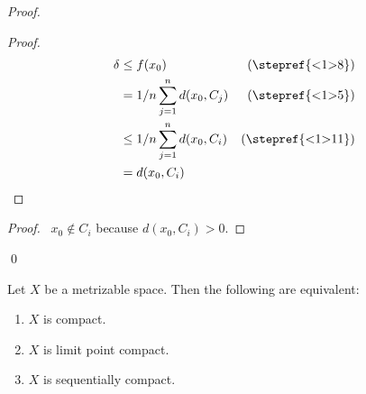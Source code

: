 \begin{proof}
  \begin{proof}
    \pf
    \begin{align*}
      \delta & \leq f(x_0) & (\text{\stepref{<1>8}}) \\
      & = 1/n \sum_{j=1}^n d(x_0, C_j) & (\text{\stepref{<1>5}}) \\
      & \leq 1/n \sum_{j=1}^n d(x_0, C_i) & (\text{\stepref{<1>11}}) \\
      & = d(x_0, C_i)
    \end{align*}
  \end{proof}
  \begin{proof}
    \pf\ $x_0 \notin C_i$ because $d(x_0, C_i) > 0$.
  \end{proof}
  \qed
\end{proof}


\begin{thm}[DC]
  \label{thm:topology:metric:compact}
  Let $X$ be a metrizable space. Then the following are equivalent:
  \begin{enumerate}
    \item $X$ is compact.
    \item $X$ is limit point compact.
    \item $X$ is sequentially compact.
  \end{enumerate}
\end{thm}

